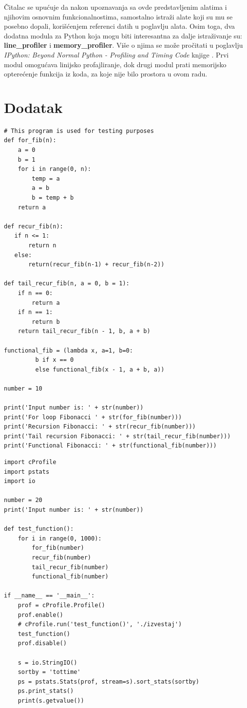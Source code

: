 \documentclass[a4paper]{article}
\begin{document}
Čitalac se upućuje da nakon upoznavanja sa ovde predstavljenim alatima i njihovim osnovnim funkcionalnostima, samostalno istraži 
alate koji su mu se posebno dopali, korišćenjem referenci datih u poglavlju alata. Osim toga, dva dodatna modula za Python koja mogu biti interesantna za dalje istraživanje su: \textbf{line\_profiler} i \textbf{memory\_profiler}. Više o njima se može pročitati u poglavlju {\em IPython: Beyond Normal Python - Profiling and Timing Code} knjige \cite{vanderplas2016python}. Prvi modul omogućava linijsko profajliranje, dok drugi modul prati memorijsko opterećenje funkcija iz koda, za koje nije bilo prostora u ovom radu.  

\appendix
 

\newpage
\appendix
\section{Dodatak}
\label{sec:dodatak}

\begin{lstlisting}[caption={Kod korišćen za testiranje modula i alata.},frame=single, label=lst:test_code]
# This program is used for testing purposes
def for_fib(n):
    a = 0
    b = 1
    for i in range(0, n):
        temp = a
        a = b
        b = temp + b
    return a

def recur_fib(n):
   if n <= 1:
       return n
   else:
       return(recur_fib(n-1) + recur_fib(n-2))
   
def tail_recur_fib(n, a = 0, b = 1): 
    if n == 0: 
        return a 
    if n == 1: 
        return b 
    return tail_recur_fib(n - 1, b, a + b)

functional_fib = (lambda x, a=1, b=0:
         b if x == 0
         else functional_fib(x - 1, a + b, a))

number = 10

print('Input number is: ' + str(number))
print('For loop Fibonacci ' + str(for_fib(number)))
print('Recursion Fibonacci: ' + str(recur_fib(number)))
print('Tail recursion Fibonacci: ' + str(tail_recur_fib(number)))
print('Functional Fibonacci: ' + str(functional_fib(number)))
\end{lstlisting}

\begin{lstlisting}[caption={Kod korišćen za testiranje modula cProfile i pstats.},frame=single, label=lst:cprofile_pstats, ]
import cProfile
import pstats
import io

number = 20
print('Input number is: ' + str(number))

def test_function():
    for i in range(0, 1000):
        for_fib(number)
        recur_fib(number)
        tail_recur_fib(number)
        functional_fib(number)

if __name__ == '__main__':
    prof = cProfile.Profile()
    prof.enable()
    # cProfile.run('test_function()', './izvestaj')
    test_function()
    prof.disable()

    s = io.StringIO()
    sortby = 'tottime'
    ps = pstats.Stats(prof, stream=s).sort_stats(sortby)
    ps.print_stats()
    print(s.getvalue())
\end{lstlisting}
\end{document}
